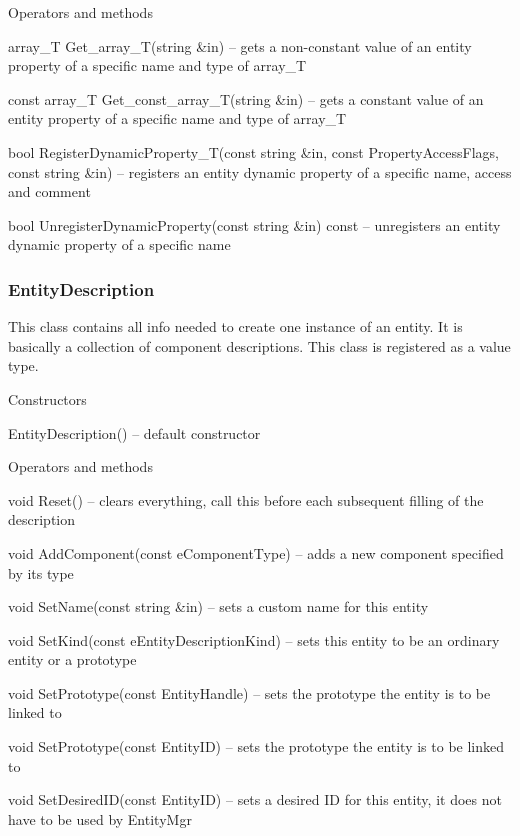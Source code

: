 \begin{titled-itemize}{Operators and methods}
  \item array\_T Get\_array\_T(string \&in) -- gets a non-constant value of an entity property of a specific name and type of array\_T
  \item const array\_T Get\_const\_array\_T(string \&in) -- gets a constant value of an entity property of a specific name and type of array\_T
  \item bool RegisterDynamicProperty\_T(const string \&in, const PropertyAccessFlags, const string \&in) -- registers an entity dynamic property of a specific name, access and comment
  \item bool UnregisterDynamicProperty(const string \&in) const -- unregisters an entity dynamic property of a specific name
\end{titled-itemize}

\subsubsection{EntityDescription}

This class contains all info needed to create one instance of an entity. It is basically a collection of component descriptions. This class is registered as a value type.

\begin{titled-itemize}{Constructors}
  \item EntityDescription() -- default constructor
\end{titled-itemize}

\begin{titled-itemize}{Operators and methods}
  \item void Reset() -- clears everything, call this before each subsequent filling of the description
  \item void AddComponent(const eComponentType) -- adds a new component specified by its type
  \item void SetName(const string \&in) -- sets a custom name for this entity
  \item void SetKind(const eEntityDescriptionKind) -- sets this entity to be an ordinary entity or a prototype
  \item void SetPrototype(const EntityHandle) -- sets the prototype the entity is to be linked to
  \item void SetPrototype(const EntityID) -- sets the prototype the entity is to be linked to
  \item void SetDesiredID(const EntityID) -- sets a desired ID for this entity, it does not have to be used by EntityMgr
\end{titled-itemize}

